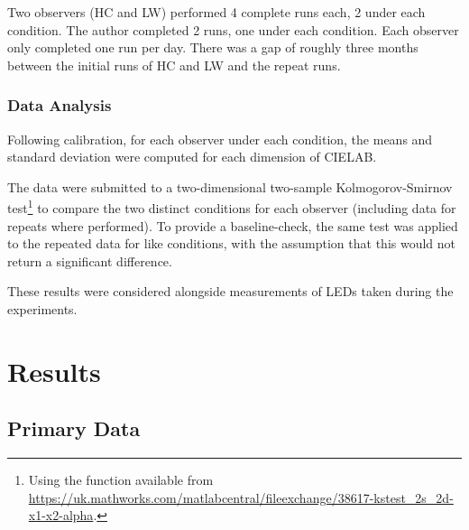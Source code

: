 Two observers (HC and LW) performed 4 complete runs each, 2 under each condition. The author completed 2 runs, one under each condition. Each observer only completed one run per day. There was a gap of roughly three months between the initial runs of HC and LW and the repeat runs.

\subsubsection{Data Analysis}

Following calibration, for each observer under each condition, the means and standard deviation were computed for each dimension of CIELAB. 

The data were submitted to a two-dimensional two-sample Kolmogorov-Smirnov test\footnote{Using the function available from \url{https://uk.mathworks.com/matlabcentral/fileexchange/38617-kstest_2s_2d-x1-x2-alpha}.} to compare the two distinct conditions for each observer (including data for repeats where performed). To provide a baseline-check, the same test was applied to the repeated data for like conditions, with the assumption that this would not return a significant difference.

These results were considered alongside measurements of LEDs taken during the experiments.

\section{Results}

\subsection{Primary Data}

